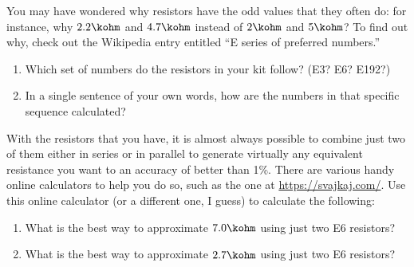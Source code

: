 \begin{Exercise}
You may have wondered why resistors have the odd values that they often do: for instance, why $2.2\kohm$ and $4.7\kohm$ instead of $2\kohm$ and $5\kohm$? To find out why, check out the Wikipedia entry entitled ``E series of preferred numbers.'' 
\begin{enumerate}[label=(\alph*),nosep]
\item Which set of numbers do the resistors in your kit follow?  (E3? E6? E192?) 
\item In a single sentence of your own words, how are the numbers in that specific sequence calculated?
\end{enumerate}
With the resistors that you have, it is almost always possible to combine just two of them either in series or in parallel to generate virtually any equivalent resistance you want to an accuracy of better than 1\%.  There are various handy online calculators to help you do so, such as the one at \url{https://svajkaj.com/}.  Use this online calculator (or a different one, I guess) to calculate the following:
\begin{enumerate}[resume*]
\item What is the best way to approximate $7.0\kohm$ using just two E6 resistors?
\item What is the best way to approximate $2.7\kohm$ using just two E6 resistors?
\end{enumerate}
\end{Exercise}

